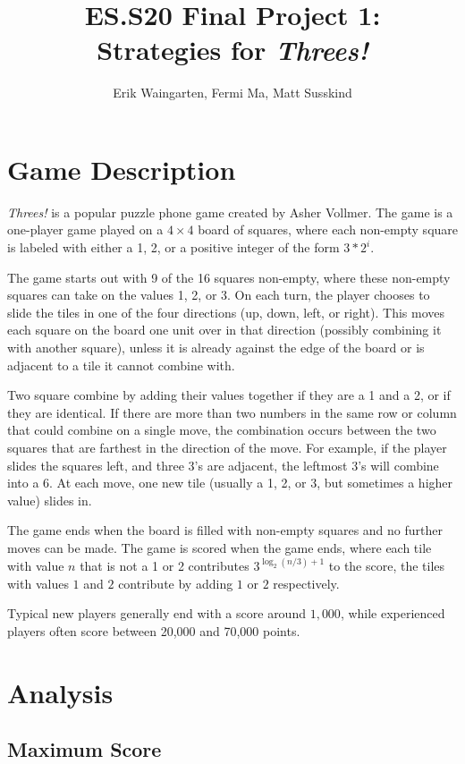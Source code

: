 \documentclass[11pt]{article}
\author{Erik Waingarten, Fermi Ma, Matt Susskind}
\title{ES.S20 Final Project 1: \\
Strategies for \emph{Threes!}}
\begin{document}
         
\maketitle

\section{Game Description}

\emph{Threes!} is a popular puzzle phone game created by Asher Vollmer. The game is a one-player game played on a $4 \times 4$ board of squares, where each non-empty square is labeled with either a 1, 2, or a positive integer of the form $3*2^i$.

The game starts out with 9 of the 16 squares non-empty, where these non-empty squares can take on the values 1, 2, or 3. On each turn, the player chooses to slide the tiles in one of the four directions (up, down, left, or right). This moves each square on the board one unit over in that direction (possibly combining it with another square), unless it is already against the edge of the board or is adjacent to a tile it cannot combine with.

Two square combine by adding their values together if they are a 1 and a 2, or if they are identical. If there are more than two numbers in the same row or column that could combine on a single move, the combination occurs between the two squares that are farthest in the direction of the move. For example, if the player slides the squares left, and three 3's are adjacent, the leftmost 3's will combine into a 6. At each move, one new tile (usually a 1, 2, or 3, but sometimes a higher value) slides in.

The game ends when the board is filled with non-empty squares and no further moves can be made. The game is scored when the game ends, where each tile with value $n$ that is not a 1 or 2 contributes $3^{\log_2(n/3)+1}$ to the score, the tiles with values $1$ and $2$ contribute by adding $1$ or $2$ respectively.

Typical new players generally end with a score around $1,000$, while experienced players often score between 20,000 and 70,000 points.

\section{Analysis}

\subsection{Maximum Score}
\end{document}
